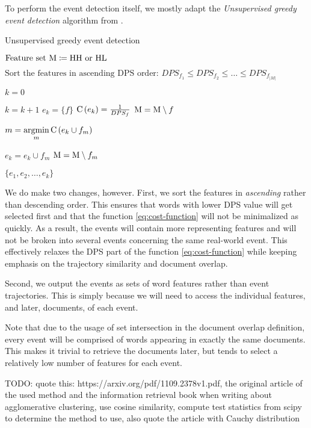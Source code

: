 To perform the event detection itself, we mostly adapt the \textit{Unsupervised greedy event detection} algorithm from \cite{event-detection}.

\begin{algorithm}[H]
\begin{algorithmic}[1]
\caption{Unsupervised greedy event detection}
\Input $\text{Feature set} ~ \text{M} \coloneqq \text{HH or HL}$

\State $\text{Sort the features in ascending DPS order: } DPS_{f_{1}} \leq DPS_{f_{2}} \leq \dots \leq DPS_{f_{\left\vert M \right\vert}}$

\State $k = 0$

	\State $k = k + 1$	
	\State $e_{k} = \{ f \}$
	\State $\text{C} \left(e_{k} \right) = \frac{1}{DPS_{f}}$
	\State $\text{M} = \text{M} \setminus f$
	
		\State $m = \operatorname*{argmin}\limits_{m}{\text{C} \left( e_{k} \cup f_{m} \right)}$

			\State $e_{k} = e_{k} \cup f_{m}$
			\State $\text{M} = \text{M} \setminus f_{m}$
		\Else
			\Break
		\EndIf
	\EndWhile
\EndFor

\Output $\{ e_{1}, e_{2}, \dots, e_{k} \}$
\end{algorithmic}
\end{algorithm}

We do make two changes, however. First, we sort the features in \textit{ascending} rather than descending order. This ensures that words with lower DPS value will get selected first and that the function \ref{eq:cost-function} will not be minimalized as quickly. As a result, the events will contain more representing features and will not be broken into several events concerning the same real-world event. This effectively relaxes the DPS part of the function \ref{eq:cost-function} while keeping emphasis on the trajectory similarity and document overlap.

Second, we output the events as sets of word features rather than event trajectories. This is simply because we will need to access the individual features, and later, documents, of each event.

Note that due to the usage of set intersection in the document overlap definition, every event will be comprised of words appearing in exactly the same documents. This makes it trivial to retrieve the documents later, but tends to select a relatively low number of features for each event.

{\color{red} TODO: quote this: https://arxiv.org/pdf/1109.2378v1.pdf, the original article of the used method and the information retrieval book when writing about agglomerative clustering, use cosine similarity, compute test statistics from scipy to determine the method to use, also quote the article with Cauchy distribution}